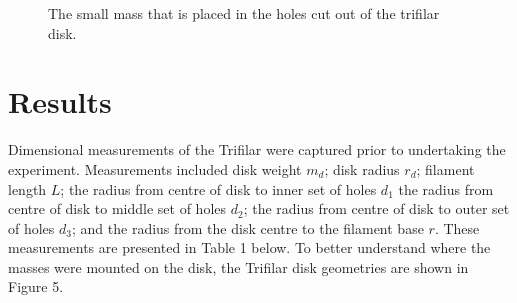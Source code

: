 \documentclass[a4paper]{article}
\begin{document}
\begin{figure}[h]
\begin{minipage}{0.45\textwidth}
	\end{minipage}
	\hspace{1cm}
	\begin{minipage}{0.45\textwidth}
		\centering
		\caption{The small mass that is placed in the holes cut out of the trifilar disk.}
	\end{minipage}
\end{figure}

\section{Results}
Dimensional measurements of the Trifilar were captured prior to undertaking the experiment. Measurements included disk weight $m_d$; disk radius $r_d$; filament length $L$; the radius from centre of disk to inner set of holes $d_1$ the radius from centre of disk to middle set of holes $d_2$; the radius from centre of disk to outer set of holes $d_3$; and the radius from the disk centre to the filament base $r$. These measurements are presented in Table 1 below. To better understand where the masses were mounted on the disk, the Trifilar disk geometries are shown in Figure 5.
\end{document}
